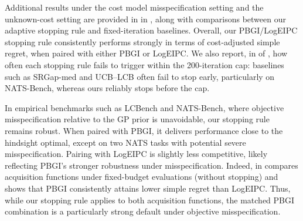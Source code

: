 Additional results under the cost model misspecification setting and the unknown-cost setting are provided in  in , along with comparisons between our adaptive stopping rule and fixed-iteration baselines.
Overall, our PBGI/LogEIPC stopping rule consistently performs strongly in terms of cost-adjusted simple regret, when paired with either PBGI or LogEIPC.
We also report, in  of , how often each stopping rule fails to trigger within the 200-iteration cap: baselines such as SRGap-med and UCB–LCB often fail to stop early, particularly on NATS-Bench, whereas ours reliably stops before the cap.

In empirical benchmarks such as LCBench and NATS-Bench, where objective misspecification relative to the GP prior is unavoidable, our stopping rule remains robust. When paired with PBGI, it delivers performance close to the hindsight optimal, except on two NATS tasks with potential severe misspecification. Pairing with LogEIPC is slightly less competitive, likely reflecting PBGI’s stronger robustness under misspecification. Indeed,  in  compares acquisition functions under fixed-budget evaluations (without stopping) and shows that PBGI consistently attains lower simple regret than LogEIPC. Thus, while our stopping rule applies to both acquisition functions, the matched PBGI combination is a particularly strong default under objective misspecification.
